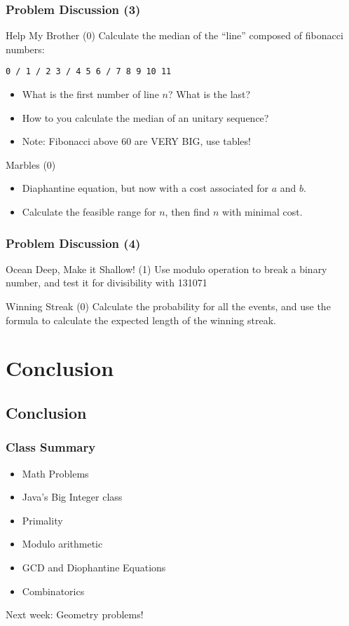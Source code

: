 \documentclass{beamer}
\begin{document}
\begin{frame}
  \frametitle{Problem Discussion (3)}
  \begin{block}{Help My Brother (0)}
    Calculate the median of the ``line'' composed of fibonacci numbers:
\begin{verbatim}
0 / 1 / 2 3 / 4 5 6 / 7 8 9 10 11
\end{verbatim}
\begin{itemize}
\item What is the first number of line $n$? What is the last?
\item How to you calculate the median of an unitary sequence?
\item Note: Fibonacci above 60 are VERY BIG, use tables!
\end{itemize}
  \end{block}
  \begin{block}{Marbles (0)}
    \begin{itemize}
    \item Diaphantine equation, but now with a cost associated for $a$ and $b$.
    \item Calculate the feasible range for $n$, then find $n$ with minimal cost.
    \end{itemize}
  \end{block}
\end{frame}

\begin{frame}
  \frametitle{Problem Discussion (4)}
  \begin{block}{Ocean Deep, Make it Shallow! (1)}
    Use modulo operation to break a binary number, and test it for
    divisibility with 131071
  \end{block}
  \begin{block}{Winning Streak (0)}
    Calculate the probability for all the events, and use the formula 
    to calculate the expected length of the winning streak.
  \end{block}
\end{frame}

\section{Conclusion}
\subsection{Conclusion}
\begin{frame}
  \frametitle{Class Summary}
  \begin{itemize}
  \item Math Problems
  \item Java's Big Integer class
  \item Primality
  \item Modulo arithmetic
  \item GCD and Diophantine Equations
  \item Combinatorics
  \end{itemize}

  \begin{block}{}
    Next week: Geometry problems!
  \end{block}
\end{frame}
\end{document}
